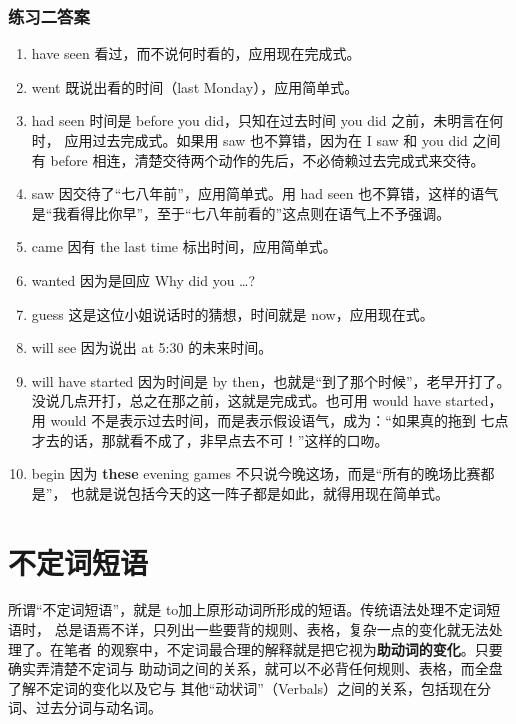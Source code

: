 \documentclass{yufa}
\begin{document}
\subsection{练习二答案}

\begin{enumerate}
\item have seen 看过，而不说何时看的，应用现在完成式。

\item went 既说出看的时间（last Monday），应用简单式。

\item had seen 时间是 before you did，只知在过去时间 you did 之前，未明言在何时，
  应用过去完成式。如果用 saw 也不算错，因为在 I saw 和 you did 之间有 before
  相连，清楚交待两个动作的先后，不必倚赖过去完成式来交待。

\item saw 因交待了“七八年前”，应用简单式。用 had seen 也不算错，这样的语气
  是“我看得比你早”，至于“七八年前看的”这点则在语气上不予强调。

\item came 因有 the last time 标出时间，应用简单式。

\item wanted 因为是回应 Why did you \ldots ?

\item guess 这是这位小姐说话时的猜想，时间就是 now，应用现在式。

\item will see 因为说出 at 5:30 的未来时间。

\item will have started 因为时间是 by then，也就是“到了那个时候”，老早开打了。
  没说几点开打，总之在那之前，这就是完成式。也可用 would have
  started，用 would 不是表示过去时间，而是表示假设语气，成为：“如果真的拖到
  七点才去的话，那就看不成了，非早点去不可！”这样的口吻。

\item begin 因为 \textbf{these} evening games 不只说今晚这场，而是“所有的晚场比赛都是”，
  也就是说包括今天的这一阵子都是如此，就得用现在简单式。
\end{enumerate}

\chapter{不定词短语}

所谓“不定词短语”，就是 to加上原形动词所形成的短语。传统语法处理不定词短语时，
总是语焉不详，只列出一些要背的规则、表格，复杂一点的变化就无法处理了。在笔者
的观察中，不定词最合理的解释就是把它视为\textbf{助动词的变化}。只要确实弄清楚不定词与
助动词之间的关系，就可以不必背任何规则、表格，而全盘了解不定词的变化以及它与
其他“动状词”（Verbals）之间的关系，包括现在分词、过去分词与动名词。
\end{document}
